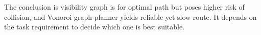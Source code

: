 \documentclass[12pt]{article}
\begin{document}
The conclusion is visibility graph is for optimal path but poses higher risk of collision, and Vonoroi graph planner yields reliable yet slow route. It depends on the task requirement to decide which one is best suitable.




 

%
%
%
 
\end{document}
